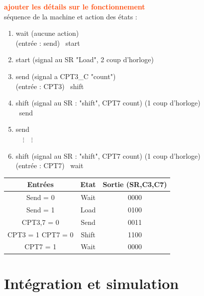 \documentclass[a4paper]{article} %
\newcommand{\red}[1]{\textbf{\textcolor{OrangeRed}{#1}}}
\begin{document}
\begin{tcolorbox}[colframe=Monokaimagenta,colback=white, breakable, enhanced]
\red{ajouter les détails sur le fonctionnement}\\
séquence de la machine et action des états :
\begin{enumerate}
	\item wait (aucune action)\\
	(entrée : send) \textrightarrow\ start
	\item start (signal au SR "Load", 2 coup d'horloge)
	\item send (signal a CPT3\_C "count")\\
	(entrée : CPT3) \textrightarrow\ shift
	\item shift (signal au SR : "shift", CPT7 count) (1 coup d'horloge)\\
	\textrightarrow\ send
	\item send \\
	$ \quad \vdots \quad \vdots$
	\item shift (signal au SR : "shift", CPT7 count) (1 coup d'horloge)\\
	(entrée : CPT7) \textrightarrow\ wait
\end{enumerate}
\begin{tabular}{|c c c|}
\hline
Entrées & Etat & Sortie  (SR,C3,C7)\\
\hline
Send = 0 & Wait & 0000 \\
Send = 1 & Load & 0100 \\
CPT3,7 = 0 & Send & 0011 \\
CPT3 = 1 CPT7 = 0& Shift & 1100 \\
CPT7 = 1 & Wait & 0000 \\
\hline
\end{tabular}

\end{tcolorbox}
\section {Intégration et simulation}
\end{document}
